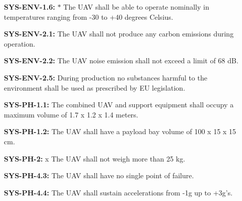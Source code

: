 \begin{enumerate}[leftmargin =4.5cm, align=parleft, labelwidth=10em]
    \item[\textbf{SYS-ENV-1.6:} $\ast$ ] The UAV shall be able to operate nominally in temperatures ranging from -30 to +40 degrees Celsius.
    \item[\textbf{SYS-ENV-2.1:} \dag] The UAV shall not produce any carbon emissions during operation. 
    \item[\textbf{SYS-ENV-2.2:}] The UAV noise emission shall not exceed a limit of 68 dB.
    \item[\textbf{SYS-ENV-2.5:}] During production no substances harmful to the environment shall be used as prescribed by EU legislation.
    \item[\textbf{SYS-PH-1.1:} \ddag] The combined UAV and support equipment shall occupy a maximum volume of 1.7 x 1.2 x 1.4 meters. 
    \item[\textbf{SYS-PH-1.2:} \dag] The UAV shall have a payload bay volume of 100 x 15 x 15 cm.    \item[\textbf{SYS-PH-2:} x ] The UAV shall not weigh more than 25 kg.
    \item[\textbf{SYS-PH-4.3:}] The UAV shall have no single point of failure.
    \item[\textbf{SYS-PH-4.4:}] The UAV shall sustain accelerations from -1g up to +3g’s.


\end{enumerate}
